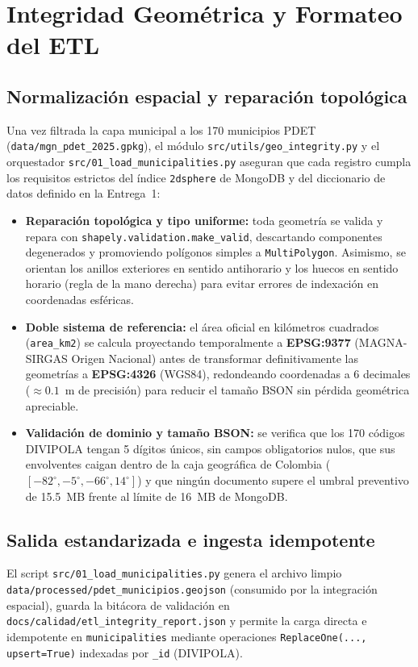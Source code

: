 \section{Integridad Geométrica y Formateo del ETL}

\subsection{Normalización espacial y reparación topológica}
Una vez filtrada la capa municipal a los 170 municipios PDET (\texttt{data/mgn\_pdet\_2025.gpkg}), el módulo
\texttt{src/utils/geo\_integrity.py} y el orquestador \texttt{src/01\_load\_municipalities.py} aseguran que
cada registro cumpla los requisitos estrictos del índice \texttt{2dsphere} de MongoDB y del diccionario de
datos definido en la Entrega~1:

\begin{itemize}
  \item \textbf{Reparación topológica y tipo uniforme:} toda geometría se valida y repara con
  \texttt{shapely.validation.make\_valid}, descartando componentes degenerados y promoviendo polígonos
  simples a \texttt{MultiPolygon}. Asimismo, se orientan los anillos exteriores en sentido antihorario
  y los huecos en sentido horario (regla de la mano derecha) para evitar errores de indexación en
  coordenadas esféricas.
  \item \textbf{Doble sistema de referencia:} el área oficial en kilómetros cuadrados (\texttt{area\_km2}) se
  calcula proyectando temporalmente a \textbf{EPSG:9377} (MAGNA-SIRGAS Origen Nacional) antes de transformar
  definitivamente las geometrías a \textbf{EPSG:4326} (WGS84), redondeando coordenadas a 6 decimales
  ($\approx 0.1$~m de precisión) para reducir el tamaño BSON sin pérdida geométrica apreciable.
  \item \textbf{Validación de dominio y tamaño BSON:} se verifica que los 170 códigos DIVIPOLA tengan 5 dígitos
  únicos, sin campos obligatorios nulos, que sus envolventes caigan dentro de la caja geográfica de Colombia
  ($[-82^\circ, -5^\circ, -66^\circ, 14^\circ]$) y que ningún documento supere el umbral preventivo de
  15.5~MB frente al límite de 16~MB de MongoDB.
\end{itemize}

\subsection{Salida estandarizada e ingesta idempotente}
El script \texttt{src/01\_load\_municipalities.py} genera el archivo limpio
\texttt{data/processed/pdet\_municipios.geojson} (consumido por la integración espacial), guarda la bitácora
de validación en \texttt{docs/calidad/etl\_integrity\_report.json} y permite la carga directa e idempotente en
\texttt{municipalities} mediante operaciones \texttt{ReplaceOne(..., upsert=True)} indexadas por \texttt{\_id}
(DIVIPOLA).
